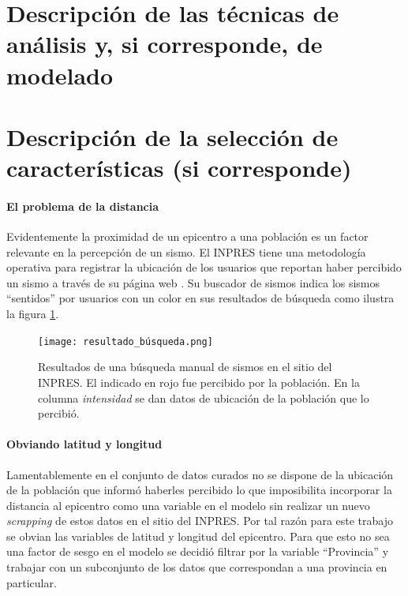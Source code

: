 \documentclass[a4paper]{report}
\begin{document}
\section{Descripción de las técnicas de análisis y, si corresponde, de modelado}



\section{Descripción de la selección de características (si corresponde)}

\paragraph{El problema de la distancia}
Evidentemente la proximidad de un epicentro a una población es un factor relevante en la percepción de un sismo.
El INPRES tiene una metodología operativa para registrar la ubicación de los usuarios que reportan haber percibido un sismo a través de su página web \cite{noauthor_acerca_nodate}.
Su buscador de sismos indica los sismos ``sentidos'' por usuarios con un color en sus resultados de búsqueda como ilustra la figura \ref{fig:resultado_búsqueda}.

\begin{figure}[!h]
\centering
\texttt{[image: resultado\_búsqueda.png]}
\caption{Resultados de una búsqueda manual de sismos en el sitio del INPRES. El indicado en rojo fue percibido por la población. En la columna \emph{intensidad} se dan datos de ubicación de la población que lo percibió.}
\label{fig:resultado_búsqueda}
\end{figure}


\paragraph{Obviando latitud y longitud}
Lamentablemente en el conjunto de datos curados no se dispone de la ubicación de la población que informó haberles percibido lo que imposibilita incorporar la distancia al epicentro como una variable en el modelo sin realizar un nuevo \emph{scrapping} de estos datos en el sitio del INPRES.
Por tal razón para este trabajo se obvian las variables de latitud y longitud del epicentro.
Para que esto no sea una factor de sesgo en el modelo se decidió filtrar por la variable ``Provincia'' y trabajar con un subconjunto de los datos que correspondan a una provincia en particular.
\end{document}
